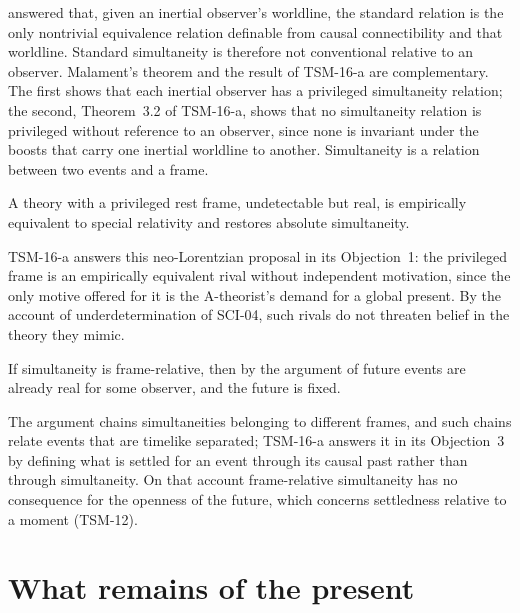 \documentclass{situationist-preprint}
\begin{document}
\citet{Malament1977} answered that, given an inertial observer's worldline, the standard relation is the only nontrivial equivalence relation definable from causal connectibility and that worldline. Standard simultaneity is therefore not conventional relative to an observer. Malament's theorem and the result of TSM-16-a are complementary. The first shows that each inertial observer has a privileged simultaneity relation; the second, Theorem~3.2 of TSM-16-a, shows that no simultaneity relation is privileged without reference to an observer, since none is invariant under the boosts that carry one inertial worldline to another. Simultaneity is a relation between two events and a frame.

\begin{objection}
A theory with a privileged rest frame, undetectable but real, is empirically equivalent to special relativity and restores absolute simultaneity.
\end{objection}

\begin{reply}
TSM-16-a answers this neo-Lorentzian proposal in its Objection~1: the privileged frame is an empirically equivalent rival without independent motivation, since the only motive offered for it is the A-theorist's demand for a global present. By the account of underdetermination of SCI-04, such rivals do not threaten belief in the theory they mimic.
\end{reply}

\begin{objection}
If simultaneity is frame-relative, then by the argument of \citet{Putnam1967} future events are already real for some observer, and the future is fixed.
\end{objection}

\begin{reply}
The argument chains simultaneities belonging to different frames, and such chains relate events that are timelike separated; TSM-16-a answers it in its Objection~3 by defining what is settled for an event through its causal past rather than through simultaneity. On that account frame-relative simultaneity has no consequence for the openness of the future, which concerns settledness relative to a moment (TSM-12).
\end{reply}

\section{What remains of the present}
\end{document}
